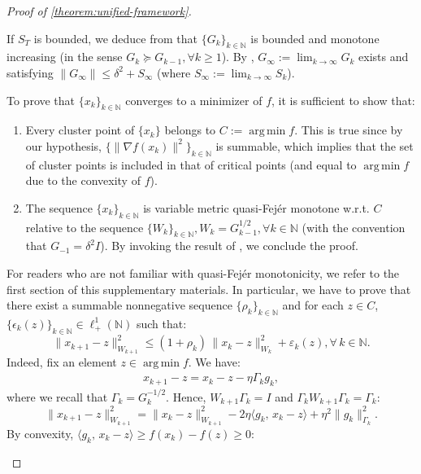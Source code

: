 \documentclass{article}
\theoremstyle{plain}
\theoremstyle{definition}
\theoremstyle{remark}
\newcommand{\N}{\mathbb{N}}
\newcommand{\ip}[2]{\langle #1,\, #2 \rangle}
\newcommand{\norm}[1]{\| #1 \|}
\newcommand{\normW}[2]{\| #1 \|_{#2}}
\newcommand{\argmin}{\operatorname{arg\,min}}
\newcommand*{\NN}{\mathbb{N}}
\begin{document}
\begin{proof}[Proof of \cref{theorem:unified-framework}]
\begin{enumerate}[leftmargin=*]
    If $S_T$ is bounded, we deduce from  that $\{G_k\}_{k \in \NN}$ is bounded and monotone increasing (in the sense $G_{k} \succeq G_{k-1}, \forall k \geq 1$). By \citet[Theorem 1.1]{behrndt2010monotone}, $G_\infty := \lim_{k \to \infty} G_k$ exists and satisfying $\|G_\infty\| \leq \delta^2 + S_\infty$ (where $S_\infty := \lim_{k \to \infty} S_k$).   

    To prove that $\{x_k\}_{k\in\NN}$ converges to a minimizer of $f$, it is sufficient to show that:
    \begin{enumerate}[leftmargin=*]
        \item Every cluster point of $\{x_k\}$ belongs to $C := \argmin f$.
        This is true since by our hypothesis, $\{\norm{\nabla f(x_k)}^2 \}_{k\in\NN}$ is summable, which implies that the set of cluster points is included in that of critical points (and equal to $\argmin f$ due to the convexity of $f$). 
        \item The sequence $\{x_k\}_{k \in \NN}$ is variable metric quasi-Fejér monotone w.r.t. $C$ relative to the sequence $\{W_k\}_{k \in \NN}, W_k = G_{k-1}^{1/2}, \forall k \in \NN$ (with the convention that $G_{-1} = \delta^2 I$).
        By invoking the result of \citet{combettes2013variable}, we conclude the proof.
    \end{enumerate}
    For readers who are not familiar with quasi-Fejér monotonicity, we refer to the first section of this supplementary materials.
    In particular, we have to prove that there exist a summable nonnegative sequence $\{\rho_k\}_{k \in \NN}$ and for each $z \in C$, $\{\epsilon_k(z)\}_{k \in \NN} \in \ell_+^1(\NN)$ such that:
    \begin{equation*}
        \normW{x_{k+1} - z}{W_{k+1}}^2
        \leq (1 + \rho_k)\,\normW{x_k - z}{W_k}^2 + \varepsilon_k(z), \forall\, k \in \N.
    \end{equation*}
    Indeed, fix an element $z \in \argmin f$. We have:
    \begin{align*}
        x_{k+1} - z = x_k - z - \eta \Gamma_{k} g_k,
    \end{align*}
    where we recall that $\Gamma_k = G_k^{-1/2}$. Hence, $W_{k+1} \Gamma_k = I$ and $\Gamma_k W_{k+1} \Gamma_k = \Gamma_k$:
    \begin{equation}
        \label{eq:adafull-expand}
        \normW{x_{k+1}-z}{W_{k+1}}^2 = \normW{x_k-z}{W_{k+1}}^2 - 2\eta\ip{g_k}{x_k - z} + \eta^2\normW{g_k}{\Gamma_k}^2.
    \end{equation}
By convexity, $\ip{g_k}{x_k - z} \geq f(x_k) - f(z) \geq 0$:

\end{enumerate}
\end{proof}
\end{document}
